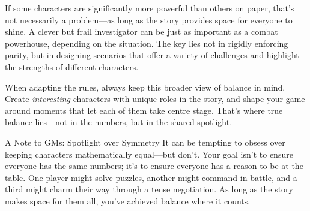 If some characters are significantly more powerful than others on paper, that’s not necessarily a problem—as long as the story provides space for everyone to shine. A clever but frail investigator can be just as important as a combat powerhouse, depending on the situation. The key lies not in rigidly enforcing parity, but in designing scenarios that offer a variety of challenges and highlight the strengths of different characters.

When adapting the rules, always keep this broader view of balance in mind. Create \emph{interesting} characters with unique roles in the story, and shape your game around moments that let each of them take centre stage. That’s where true balance lies—not in the numbers, but in the shared spotlight.

\begin{CommentBox}{A Note to GMs: Spotlight over Symmetry}
    It can be tempting to obsess over keeping characters mathematically equal—but don't. Your goal isn’t to ensure everyone has the same numbers; it’s to ensure everyone has a reason to be at the table. One player might solve puzzles, another might command in battle, and a third might charm their way through a tense negotiation. As long as the story makes space for them all, you've achieved balance where it counts.
\end{CommentBox}
